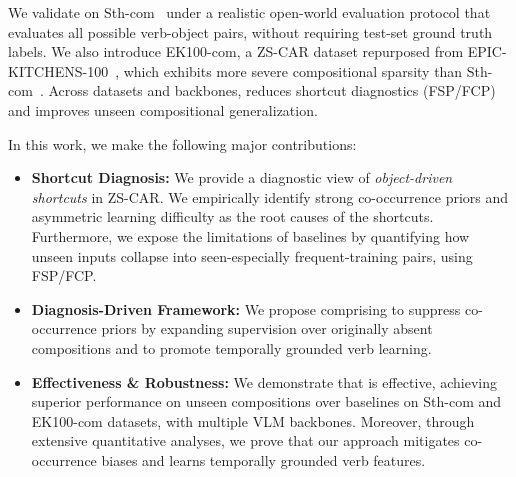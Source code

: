 We validate \ours{} on Sth-com~\cite{li2024c2c} under a realistic open-world evaluation protocol that evaluates all possible verb-object pairs, without requiring test-set ground truth labels. 
We also introduce EK100-com, a ZS-CAR dataset repurposed from EPIC-KITCHENS-100~\cite{damen2022ek100}, which exhibits more severe compositional sparsity than Sth-com~\cite{li2024c2c}.
Across datasets and backbones, \ours{} reduces shortcut diagnostics (FSP/FCP) and improves unseen compositional generalization.


In this work, we make the following major contributions:
\begin{itemize}
    \item \textbf{Shortcut Diagnosis:} We provide a diagnostic view of \emph{object-driven shortcuts} in ZS-CAR. We empirically identify strong co-occurrence priors and asymmetric learning difficulty as the root causes of the shortcuts. Furthermore, we expose the limitations of baselines by quantifying how unseen inputs collapse into seen-especially frequent-training pairs, using FSP/FCP.
    \item \textbf{Diagnosis-Driven Framework:} We propose \ours{} comprising \cpr{} to suppress co-occurrence priors by expanding supervision over originally absent compositions and \torc{} to promote temporally grounded verb learning.
    \item \textbf{Effectiveness \& Robustness:} We demonstrate that \ours{} is effective, achieving superior performance on unseen compositions over baselines on Sth-com and EK100-com datasets, with multiple VLM backbones. 
    Moreover, through extensive quantitative analyses, we prove that our approach mitigates co-occurrence biases and learns temporally grounded verb features.
\end{itemize}
